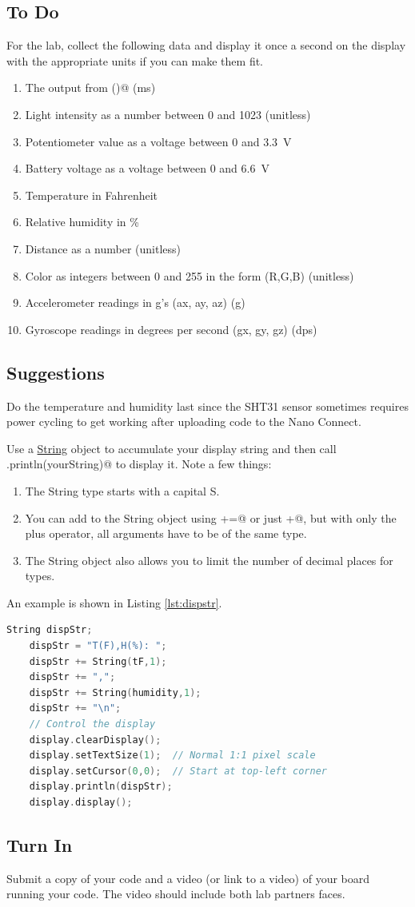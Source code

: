 \subsection{To Do}
For the lab, collect the following data and display it once a second on the display with the 
appropriate units if you can make them fit.
\begin{enumerate}
	\item The output from \lstinline@millis()@ (ms)
	\item Light intensity as a number between 0 and 1023 (unitless)
	\item Potentiometer value as a voltage between 0 and 3.3~V
	\item Battery voltage as a voltage between 0 and 6.6~V
	\item Temperature in Fahrenheit
	\item Relative humidity in \%
	\item Distance as a number (unitless)
	\item Color as integers between 0 and 255 in the form (R,G,B) (unitless)
	\item Accelerometer readings in g's (ax, ay, az) (g)
	\item Gyroscope readings in degrees per second (gx, gy, gz) (dps)
\end{enumerate}

\subsection{Suggestions}
Do the temperature and humidity last since the SHT31 sensor sometimes requires power cycling 
to get working after uploading code to the Nano Connect.

Use a \href{https://www.arduino.cc/reference/en/language/variables/data-types/stringobject/}{String} 
object to accumulate your display string and then call \lstinline@display.println(yourString)@ 
to display it. Note a few things:
\begin{enumerate}
	\item The String type starts with a capital S.
	\item You can add to the String object using \lstinline@+=@ or just \lstinline@+@, 
		but with only the plus operator, all arguments have to be of the same type. 
	\item The String object also allows you to limit the number of decimal places for \lstinline@float@ types. 
\end{enumerate}
An example is shown in Listing \ref{lst:dispstr}.
\begin{lstlisting}[caption={This is an example of using a String 
		object to display text and float variables. The floats are 
		limited to 1 decimal place such that 7.123 would be displayed as 7.1.},
		label={lst:dispstr},language=C++]
	String dispStr;
	dispStr = "T(F),H(%): ";
	dispStr += String(tF,1);
	dispStr += ",";
	dispStr += String(humidity,1);
	dispStr += "\n";
	// Control the display  
	display.clearDisplay();
	display.setTextSize(1);  // Normal 1:1 pixel scale
	display.setCursor(0,0);  // Start at top-left corner
	display.println(dispStr);
	display.display();
\end{lstlisting}

\subsection{Turn In}
Submit a copy of your code and a video (or link to a video) of your board running your code. The 
video should include both lab partners faces.